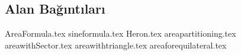\subsection{Alan Bağıntıları}
{AreaFormula.tex}
\newpage
{sineformula.tex}
\newpage
{Heron.tex}
\newpage
{areapartitioning.tex}
\newpage
{areawithSector.tex}
\newpage
{areawithtriangle.tex}
\newpage
{areaforequilateral.tex}
\newpage